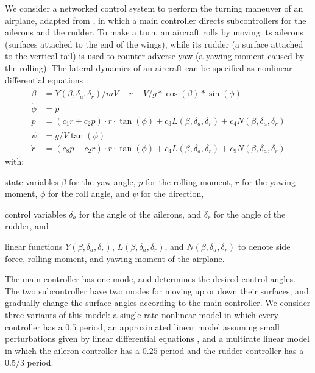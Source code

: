 We consider a networked control system
to perform the turning maneuver of an airplane,
adapted from \cite{ftscs-journal},
in which a main controller directs subcontrollers for the ailerons and the rudder.
%
To make a turn,
an aircraft rolls %
by moving its ailerons (surfaces attached to the end of the wings),
while its rudder (a surface attached to the vertical tail)
is used to counter adverse yaw
(a yawing moment %
caused by the rolling).
%
The lateral dynamics of an aircraft
can be specified as nonlinear differential equations
\cite{stevens2003aircraft}:
\[
\begin{aligned}
\dot{\beta} &= Y(\beta,\delta_a,\delta_r) / m V - r + V / g * \cos(\beta) * \sin(\phi)
\\
\dot{\phi} &= p
\\
\dot{p} &= (c_1 r + c_2 p)\cdot r \cdot \tan(\phi) + c_3 L(\beta,\delta_a,\delta_r) + c_4 N(\beta,\delta_a,\delta_r)
\\
\dot{\psi} &= g / V \tan(\phi)
\\
\dot{r} &= (c_8 p - c_2 r) \cdot r \cdot \tan(\phi) + c_4 L(\beta,\delta_a,\delta_r) + c_9 N(\beta,\delta_a,\delta_r)
\end{aligned}
\]
with:
\begin{inparaenum}[(i)]
	\item  state variables $\beta$ for the yaw angle, 
        $p$ for the rolling moment,
        $r$ for the yawing moment,
        $\phi$ for the roll angle, 
        and $\psi$ for the direction,
	\item control variables $\delta_a$ for the angle of the ailerons,
	and $\delta_r$ for the angle of the rudder,
	and
	\item 
	linear functions  
	$Y(\beta,\delta_a,\delta_r)$, $L(\beta,\delta_a,\delta_r)$, and $N(\beta,\delta_a,\delta_r)$
	to denote 
	side force, rolling moment, and yawing moment of the airplane.
\end{inparaenum}
%
The main controller has one mode,
and determines the desired control angles. %
The two subcontroller have two modes for moving up or down their surfaces,
and gradually change the surface angles according to the main controller.
%
We consider three variants of this model:
a single-rate nonlinear model
in which every controller has a $0.5$ period,
an approximated linear model
assuming small perturbations given by linear differential equations \cite{allerton2009principles}, and
a multirate linear model 
in which
the aileron controller has a $0.25$ period and the rudder controller has a $0.5/3$ period.


